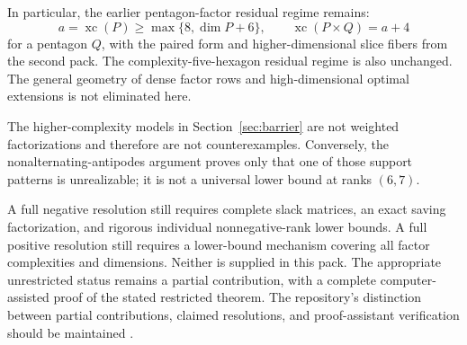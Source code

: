 \documentclass[11pt,a4paper]{article}
\newcommand{\xc}{\operatorname{xc}}
\theoremstyle{definition}\newtheorem{definition}[theorem]{Definition}
\theoremstyle{remark}\newtheorem{remark}[theorem]{Remark}
\begin{document}
In particular, the earlier pentagon-factor residual regime remains:
\[
 a=\xc(P)\ge\max\{8,\dim P+6\},\qquad
 \xc(P\times Q)=a+4
\]
for a pentagon $Q$, with the paired form and higher-dimensional slice fibers
from the second pack. The complexity-five-hexagon residual regime is also
unchanged. The general geometry of dense factor rows and high-dimensional
optimal extensions is not eliminated here.

The higher-complexity models in Section~\ref{sec:barrier} are not weighted
factorizations and therefore are not counterexamples. Conversely, the
nonalternating-antipodes argument proves only that one of those support
patterns is unrealizable; it is not a universal lower bound at ranks $(6,7)$.

A full negative resolution still requires complete slack matrices, an exact
saving factorization, and rigorous individual nonnegative-rank lower bounds.
A full positive resolution still requires a lower-bound mechanism covering
all factor complexities and dimensions. Neither is supplied in this pack.
The appropriate unrestricted status remains a partial contribution, with a
complete computer-assisted proof of the stated restricted theorem. The
repository's distinction between partial contributions, claimed resolutions,
and proof-assistant verification should be maintained \cite{guidelines}.
\end{document}
